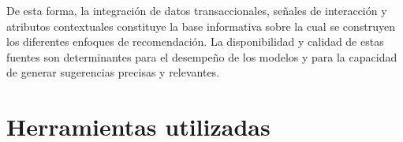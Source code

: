 De esta forma, la integración de datos transaccionales, señales de interacción y atributos contextuales constituye la base informativa sobre la cual se construyen los diferentes enfoques de recomendación. La disponibilidad y calidad de estas fuentes son determinantes para el desempeño de los modelos y para la capacidad de generar sugerencias precisas y relevantes.



\section{Herramientas utilizadas}





